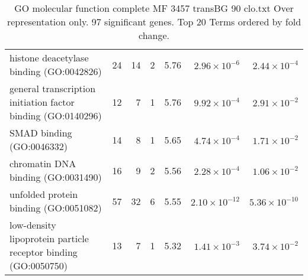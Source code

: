 \begin{table}[ht]
\begin{adjustbox}{width=\textwidth}
\begin{tabular}{lrrrlrr}
  histone deacetylase binding (GO:0042826) & 24 & 14 & 2 & 5.76 & $2.96 \times 10^{-6}$ & $2.44 \times 10^{-4}$ \\ 
  general transcription initiation factor binding (GO:0140296) & 12 & 7 & 1 & 5.76 & $9.92 \times 10^{-4}$ & $2.91 \times 10^{-2}$ \\ 
  SMAD binding (GO:0046332) & 14 & 8 & 1 & 5.65 & $4.74 \times 10^{-4}$ & $1.71 \times 10^{-2}$ \\ 
  chromatin DNA binding (GO:0031490) & 16 & 9 & 2 & 5.56 & $2.28 \times 10^{-4}$ & $1.06 \times 10^{-2}$ \\ 
  unfolded protein binding (GO:0051082) & 57 & 32 & 6 & 5.55 & $2.10 \times 10^{-12}$ & $5.36 \times 10^{-10}$ \\ 
  low-density lipoprotein particle receptor binding (GO:0050750) & 13 & 7 & 1 & 5.32 & $1.41 \times 10^{-3}$ & $3.74 \times 10^{-2}$ \\ 
   \hline
\end{tabular}
\end{adjustbox}
\caption{GO molecular function complete MF 3457 transBG 90 clo.txt Over representation only. 97 significant genes. Top 20 Terms ordered by fold change. } 
\label{tab:GO molecular function complete MF 3457 transBG 90 clo.txt Over representation only. 97 significant genes. Top 20 Terms ordered by fold change. }
\end{table}


